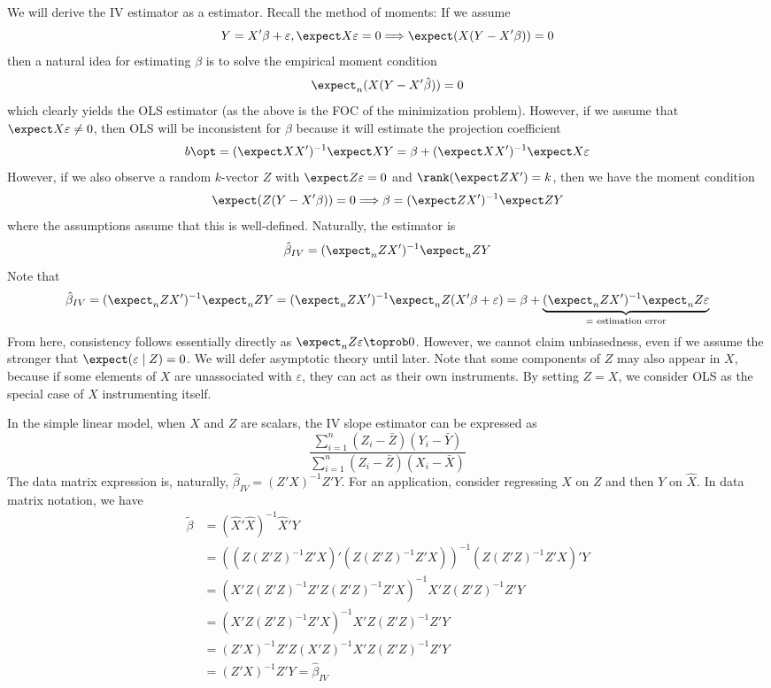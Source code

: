\documentclass[10pt]{article}
\begin{document}
\begin{definition}
	We will derive the IV estimator as a  estimator. Recall the method of moments: If we assume \[Y = X'\beta + \varepsilon ,\expect X\varepsilon = 0 \Longrightarrow \expect(X(Y - X'\beta)) = 0\]then a natural idea for estimating $\beta$ is to solve the empirical moment condition \[\expect_n (X(Y-X'\hat{\beta})) = 0\]which clearly yields the OLS estimator (as the above is the FOC of the minimization problem). However, if we assume that $\expect X\varepsilon \ne 0$, then OLS will be inconsistent for $\beta$ because it will estimate the projection coefficient \[b\opt = (\expect XX')^{-1}\expect XY = \beta + (\expect XX')^{-1} \expect X\varepsilon\]However, if we also observe a random $k$-vector $Z$ with $\expect Z\varepsilon = 0$ and $\rank(\expect ZX')=k$, then we have the moment condition \[\expect (Z(Y-X'\beta)) = 0 \Longrightarrow \beta = (\expect ZX')^{-1} \expect ZY\]where the assumptions assume that this is well-defined. Naturally, the estimator is \[\hat{\beta}_{IV} = (\expect_n ZX')^{-1} \expect_n ZY\]Note that \[\hat{\beta}_{IV} = (\expect_n ZX')^{-1} \expect_n ZY = (\expect_n ZX')^{-1} \expect_n Z(X'\beta + \varepsilon)= \beta + \underbrace{(\expect_nZX')^{-1} \expect_n Z\varepsilon}_{=\text{ estimation error}}\]From here, consistency follows essentially directly as $\expect_n Z\varepsilon \toprob 0$. However, we cannot claim unbiasedness, even if we assume the stronger that $\expect(\varepsilon \mid Z) = 0$. We will defer asymptotic theory until later. Note that some components of $Z$ may also appear in $X$, because if some elements of $X$ are unassociated with $\varepsilon$, they can act as their own instruments. By setting $Z = X$, we consider OLS as the special case of $X$ instrumenting itself.
\end{definition}

In the simple linear model, when $X$ and $Z$ are scalars, the IV slope estimator can be expressed as \[\frac{\sum_{i=1}^n (Z_i - \bar{Z})(Y_i - \bar{Y})}{\sum_{i=1}^n (Z_i - \bar{Z})(X_i - \bar{X})}\]The data matrix expression is, naturally, $\hat{\beta}_{IV} = (Z'X)^{-1}Z'Y$. For an application, consider regressing $X$ on $Z$ and then $Y$ on $\hat{X}$. In data matrix notation, we have 
\begin{align*}
	\tilde{\beta} &= (\hat{X}'\hat{X})^{-1}\hat{X}'Y \\ &= ((Z(Z'Z)^{-1}Z'X)'(Z(Z'Z)^{-1}Z'X))^{-1}(Z(Z'Z)^{-1}Z'X)'Y \\&= (X'Z(Z'Z)^{-1}Z'Z(Z'Z)^{-1}Z'X)^{-1}X'Z(Z'Z)^{-1}Z'Y \\ &= (X'Z(Z'Z)^{-1}Z'X)^{-1}X'Z(Z'Z)^{-1}Z'Y \\ &= (Z'X)^{-1}Z'Z(X'Z)^{-1}X'Z(Z'Z)^{-1}Z'Y \\ &= (Z'X)^{-1}Z'Y = \hat{\beta}_{IV}
\end{align*}
\end{document}
